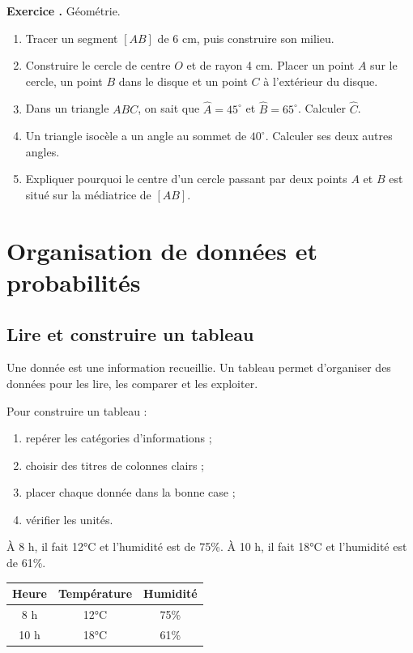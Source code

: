 \documentclass[11pt,a4paper]{article}
\newcounter{exo}
\newcommand{\exercice}[1]{\refstepcounter{exo}\begin{exobox}\textbf{Exercice \theexo.} #1\end{exobox}}
\begin{document}
\exercice{Géométrie.
\begin{enumerate}[label=\alph*)]
\item Tracer un segment \([AB]\) de 6 cm, puis construire son milieu.
\item Construire le cercle de centre \(O\) et de rayon 4 cm. Placer un point \(A\) sur le cercle, un point \(B\) dans le disque et un point \(C\) à l'extérieur du disque.
\item Dans un triangle \(ABC\), on sait que \(\widehat{A}=45^\circ\) et \(\widehat{B}=65^\circ\). Calculer \(\widehat{C}\).
\item Un triangle isocèle a un angle au sommet de \(40^\circ\). Calculer ses deux autres angles.
\item Expliquer pourquoi le centre d'un cercle passant par deux points \(A\) et \(B\) est situé sur la médiatrice de \([AB]\).
\end{enumerate}}

\section{Organisation de données et probabilités}

\subsection{Lire et construire un tableau}

\begin{definitionbox}
Une donnée est une information recueillie. Un tableau permet d'organiser des données pour les lire, les comparer et les exploiter.
\end{definitionbox}

\begin{methodbox}
Pour construire un tableau :
\begin{enumerate}[label=\arabic*)]
\item repérer les catégories d'informations ;
\item choisir des titres de colonnes clairs ;
\item placer chaque donnée dans la bonne case ;
\item vérifier les unités.
\end{enumerate}
\end{methodbox}

\begin{exemplebox}
À 8 h, il fait 12°C et l'humidité est de 75\%. À 10 h, il fait 18°C et l'humidité est de 61\%.
\begin{center}
\begin{tabular}{|c|c|c|}
\hline
Heure & Température & Humidité \\\hline
8 h & 12°C & 75\% \\\hline
10 h & 18°C & 61\% \\\hline
\end{tabular}
\end{center}
\end{exemplebox}
\end{document}
